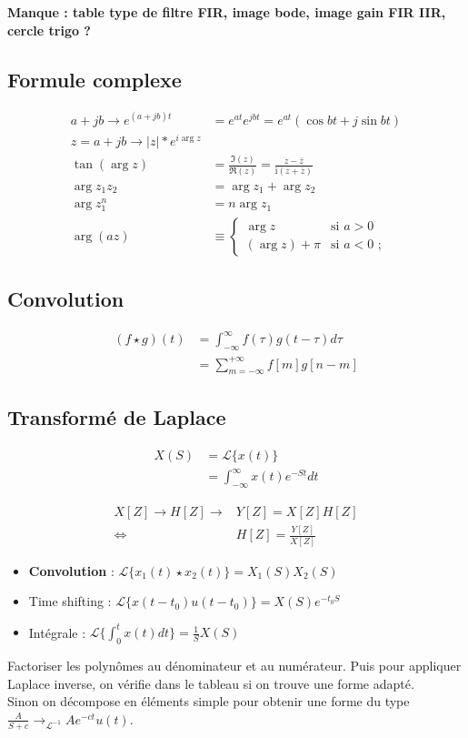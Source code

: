 \documentclass[9pt]{article}
\begin{document}
\footnotesize   
\begin{multicols}{2}
\textbf{Manque : table type de filtre FIR, image bode, image gain FIR IIR, cercle trigo ?}
\subsection{Formule complexe}
\begin{align*}
    a + jb \to e^{(a+jb)t} &= e^{at}e^{jbt} = e^{at}(\cos bt + j \sin bt) \\
    z = a + jb \to \left| z \right| * e^{i \arg z} \\
    \tan(\arg z)&={\frac {\Im (z)}{\Re (z)}}={\frac {z-{\bar {z}}}{\mathrm {i} \left(z+{\bar {z}}\right)}} \\
    \arg z_1z_2 &= \arg z_1 + \arg z_2 \\
    \arg z_1^n &= n\arg z_1 \\
    \arg(az) &\equiv {\begin{cases}\arg z&{\text{si }}a>0\\(\arg z)+\pi &{\text{si }}a<0{\text{ ;}}\end{cases}}
\end{align*}

\subsection{Convolution}
\begin{align*}
    (f \star g)(t) &= \int _{-\infty }^{\infty }f(\tau )g(t-\tau )d\tau \\
                    &= \sum_{m=-\infty }^{+\infty} f[m]g[n - m]
\end{align*}

\subsection{Transformé de Laplace}
\begin{align*}
    X(S) &= \mathcal{L}\{x(t)\} \\
        &= \int_{-\infty }^{\infty }x(t)e^{-St}dt
\end{align*}

\begin{align*}
    X[Z] \to H[Z] \to &Y[Z] = X[Z]H[Z] \\
    \Leftrightarrow & H[Z] = \frac{Y[Z]}{X[Z]}
\end{align*}

\begin{itemize}
    \item \textbf{Convolution} : $ \mathcal{L}\{x_1(t) \star x_2(t)\} = X_1(S) X_2(S)$ 
    \item Time shifting : $ \mathcal{L}\{x(t-t_0) u(t - t_0)\} = X(S)e^{-t_0 S}$ 
    \item Intégrale : $ \mathcal{L}\{\int_{0}^{t}x(t)dt\} = \frac{1}{S}X(S) $ 
\end{itemize}
Factoriser les polynômes au dénominateur et au numérateur. Puis pour appliquer Laplace inverse, on vérifie dans le tableau si on trouve une forme adapté. \\
Sinon on décompose en éléments simple pour obtenir une forme du type $ \frac{A}{S+c} \to _{\mathcal{L}^{-1}} A e^{-ct}u(t)$.


\end{multicols}
\end{document}
